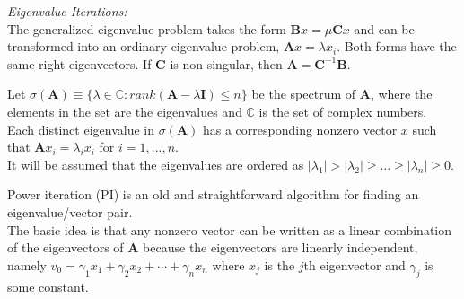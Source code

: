\documentclass[12pt]{article}
\newcommand{\ve}[1]{\ensuremath{\mathbf{#1}}}
\begin{document}
\textit{Eigenvalue Iterations:}\\
The generalized eigenvalue problem takes the form $\ve{B}x = \mu \ve{C}x$ and can be transformed into an ordinary eigenvalue problem, $\ve{A}x= \lambda x_i$. Both forms have the same right eigenvectors. If $\ve{C}$ is non-singular, then $\ve{A} = \ve{C}^{-1}\ve{B}$.

Let $\sigma(\ve{A}) \equiv \{\lambda \in \mathbb{C} : rank(\ve{A} - \lambda \ve{I}) \le n\}$ be the spectrum of $\ve{A}$, where the elements in the set are the eigenvalues and $\mathbb{C}$ is the set of complex numbers.\\ %
Each distinct eigenvalue in $\sigma(\ve{A})$ has a corresponding nonzero vector $x$ such that $\ve{A}x_{i} = \lambda_{i} x_{i}$ for $i = 1,...,n$.\\
It will be assumed that the eigenvalues are ordered as $|\lambda_{1}| > |\lambda_{2}| \ge \dots \ge |\lambda_{n}| \ge 0$. 

Power iteration (PI) is an old and straightforward algorithm for finding an eigenvalue/vector pair. \\
The basic idea is that any nonzero vector can be written as a linear combination of the eigenvectors of $\ve{A}$ because the eigenvectors are linearly independent, namely $v_0 = \gamma_1 x_1 + \gamma_2 x_2 + \cdots + \gamma_n x_n$ where $x_{j}$ is the $j$th eigenvector and $\gamma_{j}$ is some constant.%
\end{document}
